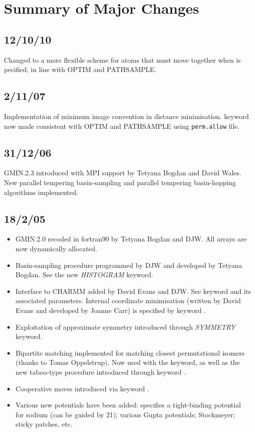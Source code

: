 {%
\section{Summary of Major Changes}

\subsection{12/10/10}
Changed to a more flexible scheme for atoms that must move together when
{\/} is pecified, in line with OPTIM and PATHSAMPLE.

\subsection{2/11/07}
Implementation of minimum image convention in distance minimisation.
{} keyword now made consistent with OPTIM and PATHSAMPLE
using {\tt perm.allow} file.

\subsection{31/12/06}
GMIN.2.3 introduced with MPI support by Tetyana Bogdan and David Wales.
New parallel tempering basin-sampling and
parallel tempering basin-hopping algorithms implemented.

\subsection{18/2/05}
\begin{itemize}
\item GMIN.2.0 recoded in fortran90 by Tetyana Bogdan and DJW. All arrays are now dynamically allocated.
\item Basin-sampling procedure programmed by DJW and developed by Tetyana Bogdan. See the new
{\it HISTOGRAM} keyword.
\item Interface to CHARMM added by David Evans and DJW. See keyword {} and its associated 
parameters. Internal coordinate minimisation (written by David Evans and developed by Joanne Carr) 
is specified by keyword {}.
\item Exploitation of approximate symmetry introduced through {\it SYMMETRY} keyword.
\item Bipartite matching implemented for matching closest permutational isomers
(thanks to Tomas Oppelstrup). Now used with 
the {} keyword, as well as the new taboo-type procedure introduced through keyword {}.
\item Cooperative moves introduced via keyword {}.
\item Various new potentials have been added: {} specifies a tight-binding potential
for sodium (can be guided by { 21}); various Gupta potentials; Stockmeyer; sticky patches, etc.
\end{itemize}

}
